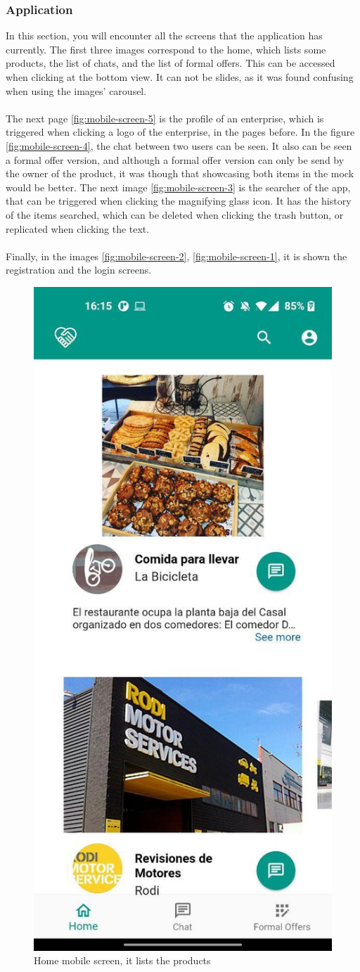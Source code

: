 \documentclass[./main.tex]{subfiles}
\begin{document}
\subsubsection{Application}
In this section, you will encounter all the screens that the application has currently. The first three images correspond to the home, which lists some products, the list of chats, and the list of formal offers. This can be accessed when clicking at the bottom view. It can not be slides, as it was found confusing when using the images' carousel.\\
\\
The next page \ref{fig:mobile-screen-5} is the profile of an enterprise, which is triggered when clicking a logo of the enterprise, in the pages before. In the figure \ref{fig:mobile-screen-4}, the chat between two users can be seen. It also can be seen a formal offer version, and although a formal offer version can only be send by the owner of the product, it was though that showcasing both items in the mock would be better. The next image \ref{fig:mobile-screen-3} is the searcher of the app, that can be triggered when clicking the magnifying  glass icon. It has the history of the items searched, which can be deleted when clicking the trash button, or replicated when clicking the text.\\
\\
Finally, in the images \ref{fig:mobile-screen-2}, \ref{fig:mobile-screen-1}, it is shown the registration and the login screens.
\begin{figure}[H]
	\centering
	\includegraphics[width=0.5\linewidth]{img/mobile-screen-8.jpg}
	\caption{Home mobile screen, it lists the products}
	\label{fig:mobile-screen-8}
\end{figure}
\end{document}
